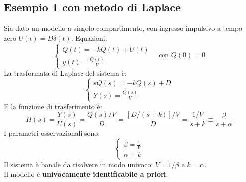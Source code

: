 \subsection{Esempio 1 con metodo di Laplace}
Sia dato un modello a singolo compartimento, con ingresso impulsivo a tempo zero $U(t) = D\delta(t)$.
Equazioni:
\begin{equation}
    \begin{cases}
\dot{Q}(t) = -kQ(t) + U(t) \\
y(t) = \frac{Q(t)}{V}
    \end{cases}
    \quad \text{con } Q(0) = 0
\end{equation}
La trasformata di Laplace del sistema è:
\begin{equation}
\begin{cases}
sQ(s) = -kQ(s) + D \\
Y(s) = \frac{Q(s)}{V}
\end{cases}
\end{equation}
E la funzione di trasferimento è:
\begin{equation}
H(s) = \frac{Y(s)}{U(s)} = \frac{Q(s)/V}{D} = \frac{[D/(s+k)]/V}{D} = \frac{1/V}{s + k} \equiv \frac{\beta}{s + \alpha}
\end{equation}
I parametri osservazionali sono:
\begin{equation}
\begin{cases}
\beta = \frac{1}{V} \\
\alpha = k
\end{cases}
\end{equation}
Il sistema è banale da risolvere in modo univoco: $V = 1/\beta$ e $k = \alpha$. \\
Il modello è \textbf{univocamente identificabile a priori}.

